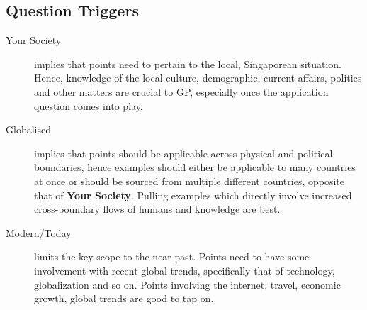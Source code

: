 \documentclass[../../main]{subfiles}
\begin{document}
\subsection{Question Triggers}

\begin{description}
	\item[Your Society] implies that points need to pertain to the local, Singaporean situation. Hence, knowledge of the local culture, demographic, current affairs, politics and other matters are crucial to GP, especially once the application question comes into play.
	\item[Globalised] implies that points should be applicable across physical and political boundaries, hence examples should either be applicable to many countries at once or should be sourced from multiple different countries, opposite that of \textbf{Your Society}. Pulling examples which directly involve increased cross-boundary flows of humans and knowledge are best.
	\item[Modern/Today] limits the key scope to the near past. Points need to have some involvement with recent global trends, specifically that of technology, globalization and so on. Points involving the internet, travel, economic growth, global trends are good to tap on.
\end{description}
\end{document}
